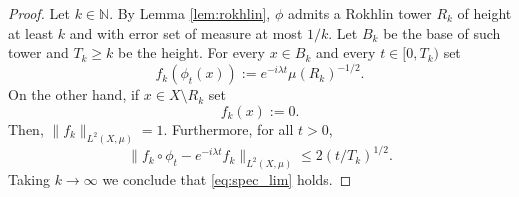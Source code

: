 \documentclass[10pt,a4paper]{amsart}
\begin{document}
\begin{proof}
Let $k \in \mathbb{N}$. By Lemma \ref{lem:rokhlin}, $\phi$ admits a Rokhlin tower $R_k$ of height at least $k$ and with error set of measure at most $1/k$. Let $B_k$ be the base of such tower and $T_k \geq k$ be the height. For every $x \in B_k$ and every $t \in [0,T_k)$ set
\[
f_k(\phi_t(x)) := e^{-i \lambda t} \mu(R_k)^{-1/2}.
\]
On the other hand, if $x \in X \setminus R_k$ set
\[
f_k(x) := 0.
\]
Then, $\|f_k\|_{L^2(X,\mu)} = 1$. Furthermore, for all $t > 0$,
\[
\|f_k \circ \phi_t - e^{-i\lambda t} f_k\|_{L^2(X,\mu)} \leq  2(t/T_k)^{1/2}.
\]
Taking $k \to \infty$ we conclude that \eqref{eq:spec_lim} holds.
\end{proof}
\end{document}
